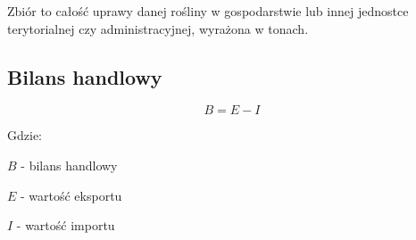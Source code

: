\documentclass[a4paper,10pt]{article}
\begin{document}
  Zbiór to całość uprawy danej rośliny w gospodarstwie lub innej jednostce terytorialnej czy administracyjnej, wyrażona w tonach.
  
  \subsection{Bilans handlowy}
  
  \begin{equation}
   B = E - I
  \end{equation}
  
  Gdzie:
  
  $ B $ - bilans handlowy

  $ E $ - wartość eksportu
  
  $ I $ - wartość importu
\end{document}
